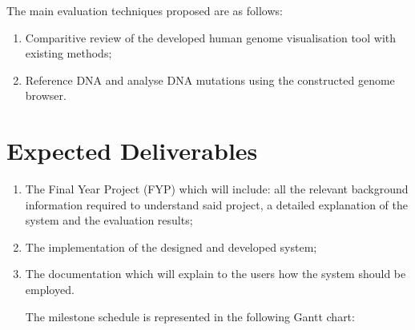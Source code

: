 \documentclass{csfyp}
\begin{document}
The main evaluation techniques proposed are as follows:

\begin{enumerate}[nolistsep]

  \item Comparitive review of the developed human genome visualisation tool with existing methods;

  \item Reference DNA and analyse DNA mutations using the constructed genome browser.

\end{enumerate}


\section{Expected Deliverables}

\begin{enumerate}[nolistsep]

  \item The Final Year Project (FYP) which will include: all the relevant background information required to understand said project, a detailed explanation of the system and the evaluation results; 

  \item The implementation of the designed and developed system;

  \item The documentation which will explain to the users how the system should be employed. 

The milestone schedule is represented in the following Gantt chart:


\end{enumerate}


%

\nocite{*}

\end{document}
